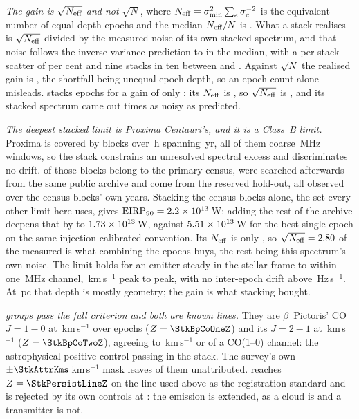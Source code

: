 \emph{The gain is $\sqrt{N_{\rm eff}}$ and not $\sqrt{N}$}, where
$N_{\rm eff}=\sigma_{\min}^{2}\sum_e\sigma_e^{-2}$ is the equivalent number of
equal-depth epochs and the median $N_{\rm eff}/N$ is \StkNeffFrac. What a
stack realises is $\sqrt{N_{\rm eff}}$ divided by the measured noise of its
own stacked spectrum, and that noise follows the inverse-variance prediction
to \StkGainVsNeff{} in the median, with a per-stack scatter of
\StkMadZScatterPct{} per cent and nine stacks in ten between \SzNoiseLo{} and
\SzNoiseHi. Against $\sqrt{N}$ the realised gain is \StkGainVsN, the
shortfall being unequal epoch depth, so an epoch count alone misleads.
\StkWorstStar{} stacks \StkWorstN{} epochs for a gain of only \StkWorstGain:
its $N_{\rm eff}$ is \StkWorstNeff, so $\sqrt{N_{\rm eff}}$ is
\SzWorstSqrtNeff, and its stacked spectrum came out \SzWorstNoise{} times as
noisy as predicted.

\emph{The deepest stacked limit is Proxima Centauri's, and it is a Class~B
limit.} Proxima is covered by \StkProxN{} blocks over \StkProxHours\,h
spanning \StkProxSpanYr\,yr, all of them coarse \ChanBModeMHz\,MHz windows,
so the stack constrains an unresolved spectral excess and discriminates no
drift. \SxProxEbCensus{} of those blocks belong to the primary census,
\SzProxEbSearched{} were searched afterwards from the same public archive and
\SzProxEbHold{} come from the reserved hold-out, all observed over the census
blocks' own years. Stacking the census blocks alone, the set every
other limit here uses, gives
$\mathrm{EIRP}_{90}=2.2\times10^{13}$\,W; adding the rest of the
archive deepens that by \SzProxDeepen{} to $1.73\times10^{13}$\,W, against
$5.51 \times 10^{13}$\,W for the best single epoch on the same
injection-calibrated convention. Its $N_{\rm eff}$ is only \StkProxNeff, so
$\sqrt{N_{\rm eff}}=2.80$ of the measured \StkProxGain{} is what
combining the epochs buys, the rest being this spectrum's own noise. The limit
holds for an emitter steady in the stellar frame to within one
\ChanBModeMHz\,MHz channel,
\StkProxTolKms\,km\,s$^{-1}$ peak to peak, with no inter-epoch drift above
\StkProxDriftHzS\,Hz\,s$^{-1}$. At \StkProxDistPc\,pc that depth is mostly
geometry; the gain is what stacking bought.

\emph{\StkNSurvive{} groups pass the full criterion and both are known
lines.} They are $\beta$~Pictoris' CO $J=1\!-\!0$ at
\StkBpCoOneOff\,km\,s$^{-1}$ over \StkBpCoOneN{} epochs ($Z=\StkBpCoOneZ$)
and its $J=2\!-\!1$ at \StkBpCoTwoOff\,km\,s$^{-1}$ ($Z=\StkBpCoTwoZ$),
agreeing to \StkBpCrossKms\,km\,s$^{-1}$ or \StkBpCrossChan{} of a CO(1--0)
channel: the astrophysical positive control passing in the stack. The
survey's own $\pm\StkAttrKms$\,km\,s$^{-1}$ mask leaves
\StkNUnattributedComputed{} of them unattributed. \StkPersistLineStar{} reaches
$Z=\StkPersistLineZ$ on the line used above as the registration standard and is
rejected by its own controls at \StkPersistLineCtrl: the emission is extended,
as a cloud is and a transmitter is not.


